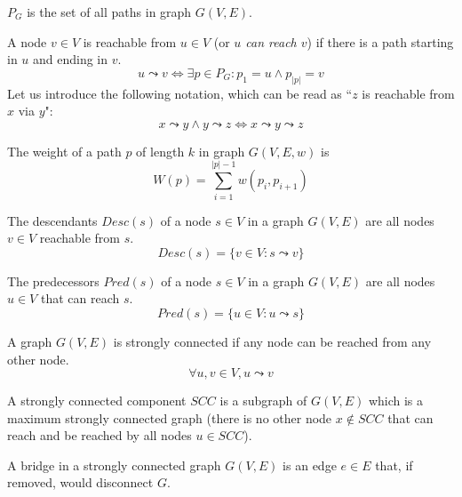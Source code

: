 \begin{definition}
    $P_G$ is the set of all paths in graph $G(V,E)$.
\end{definition}
\begin{definition}[Reachability]
    A node $v \in V$ is reachable from $u \in V$ (or \emph{$u$ can reach $v$}) if there is a path starting in $u$ and ending in $v$.
    \begin{equation*}
        u \leadsto v \iff \exists p \in P_G \colon p_1 = u \wedge p_{|p|} = v
    \end{equation*}
    Let us introduce the following notation, which can be read as ``$z$ is reachable from $x$ via $y$":
    \begin{equation*}
        x \leadsto y \wedge y \leadsto z \iff x \leadsto y \leadsto z
    \end{equation*}
\end{definition}
\begin{definition}
    The weight of a path $p$ of length $k$ in graph $G(V,E,w)$ is
    \begin{equation*}
        W(p) = \sum_{i=1}^{|p|-1}{w(p_i, p_{i+1})}
    \end{equation*}
\end{definition}
\begin{definition}[Descendants] The descendants $Desc(s)$ of a node $s \in V$ in a graph $G(V,E)$ are all nodes $v \in V$ reachable from $s$.
    \begin{equation*}
        Desc(s) = \{v \in V : s \leadsto v\}
    \end{equation*}
\end{definition}
\begin{definition}[Predecessors] The predecessors $Pred(s)$ of a node $s \in V$ in a graph $G(V,E)$ are all nodes $u \in V$ that can reach $s$.
    \begin{equation*}
        Pred(s) = \{u \in V : u \leadsto s\}
    \end{equation*}
\end{definition}
\begin{definition}
    A graph $G(V, E)$ is strongly connected if any node can be reached from any other node.
    \begin{equation*}
        \forall u, v \in V, u \leadsto v
    \end{equation*}
\end{definition}
\begin{definition}
    A strongly connected component $SCC$ is a subgraph of $G(V, E)$ which is a maximum strongly connected graph (there is no other node $x \not \in SCC$ that can reach and be reached by all nodes $u \in SCC$).
\end{definition}
\begin{definition}[Bridge]
    A bridge in a strongly connected graph $G(V,E)$ is an edge $e \in E$ that, if removed, would disconnect $G$.
\end{definition}
